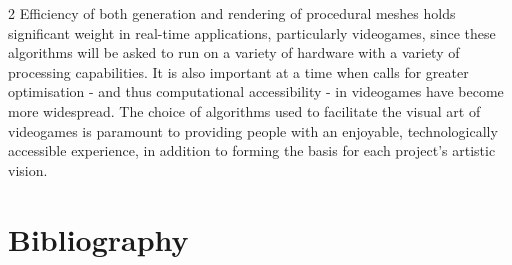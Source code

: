 \documentclass[]{article}
\begin{document}
\begin{multicols}{2}
Efficiency of both generation and rendering of procedural meshes holds significant weight in real-time applications, particularly videogames, since these algorithms will be asked to run on a variety of hardware with a variety of processing capabilities. It is also important at a time when calls for greater optimisation - and thus computational accessibility - in videogames have become more widespread. The choice of algorithms used to facilitate the visual art of videogames is paramount to providing people with an enjoyable, technologically accessible experience, in addition to forming the basis for each project's artistic vision.

\section{Bibliography}\label{bibliography}


\end{multicols}
\end{document}
